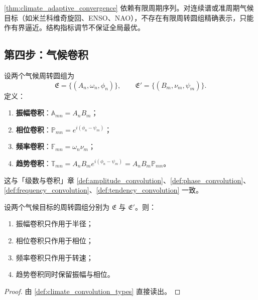 \begin{remark}[动态调节的边界]\label{rem:climate_adaptive_boundary}
\cref{thm:climate_adaptive_convergence} 依赖有限周期序列。对连续谱或准周期气候目标（如米兰科维奇旋回、ENSO、NAO），不存在有限周转圆组精确表示，只能作有界逼近。结构指标调节不保证全局最优。
\end{remark}

\subsection{第四步：气候卷积}

\begin{definition}\label{def:climate_convolution_types}
设两个气候周转圆组为
\[
\mathfrak E=\{(A_n,\omega_n,\phi_n)\},\qquad
\mathfrak E'=\{(B_m,\nu_m,\psi_m)\}.
\]
定义：
\begin{enumerate}[label=(\roman*)]
    \item \textbf{振幅卷积}：$\mathbb A_{mn}=A_nB_m$；
    \item \textbf{相位卷积}：$\mathbb P_{mn}=e^{i(\phi_n-\psi_m)}$；
    \item \textbf{频率卷积}：$\mathbb F_{mn}=\omega_n\nu_m$；
    \item \textbf{趋势卷积}：$\mathbb T_{mn}=A_nB_m e^{i(\phi_n-\psi_m)}=A_nB_m\mathbb P_{mn}$。
\end{enumerate}
这与「级数与卷积」章 \cref{def:amplitude_convolution}、\cref{def:phase_convolution}、\cref{def:frequency_convolution}、\cref{def:tendency_convolution} 一致。
\end{definition}

\begin{theorem}[三类卷积在气候周转圆组上的作用]\label{thm:climate_convolution_action}
设两个气候目标的周转圆组分别为 $\mathfrak E$ 与 $\mathfrak E'$。则：
\begin{enumerate}[label=(\roman*)]
    \item 振幅卷积只作用于半径；
    \item 相位卷积只作用于相位；
    \item 频率卷积只作用于转速；
    \item 趋势卷积同时保留振幅与相位。
\end{enumerate}
\end{theorem}

\begin{proof}
由 \cref{def:climate_convolution_types} 直接读出。
\end{proof}

